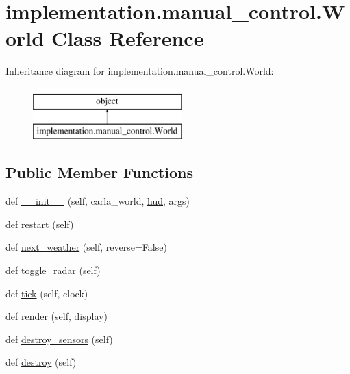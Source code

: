 \hypertarget{classimplementation_1_1manual__control_1_1_world}{}\section{implementation.\+manual\+\_\+control.\+World Class Reference}
\label{classimplementation_1_1manual__control_1_1_world}
Inheritance diagram for implementation.\+manual\+\_\+control.\+World\+:\begin{figure}[H]
\begin{center}
\leavevmode
\includegraphics[height=2.000000cm]{classimplementation_1_1manual__control_1_1_world}
\end{center}
\end{figure}
\subsection*{Public Member Functions}
\begin{DoxyCompactItemize}
\item 
def \hyperlink{classimplementation_1_1manual__control_1_1_world_a9b7dd149b43999a3578fb5287a90dac3}{\+\_\+\+\_\+init\+\_\+\+\_\+} (self, carla\+\_\+world, \hyperlink{classimplementation_1_1manual__control_1_1_world_a6d64507eaf864aa44077eecde0802a13}{hud}, args)
\item 
def \hyperlink{classimplementation_1_1manual__control_1_1_world_a25192730f365273418892f75cfe4fda8}{restart} (self)
\item 
def \hyperlink{classimplementation_1_1manual__control_1_1_world_aab2e4fc6ea1fb0a60e70723265c9005c}{next\+\_\+weather} (self, reverse=False)
\item 
def \hyperlink{classimplementation_1_1manual__control_1_1_world_a1da88da4b1d285a7735b8d602e6a7879}{toggle\+\_\+radar} (self)
\item 
def \hyperlink{classimplementation_1_1manual__control_1_1_world_a3983fc58382d912661a40b1bfc1db7b9}{tick} (self, clock)
\item 
def \hyperlink{classimplementation_1_1manual__control_1_1_world_acd682215837c65396e3a7341b6578f1f}{render} (self, display)
\item 
def \hyperlink{classimplementation_1_1manual__control_1_1_world_a3f0e79efb4722f7e88af7a6a74aa9973}{destroy\+\_\+sensors} (self)
\item 
def \hyperlink{classimplementation_1_1manual__control_1_1_world_a9ac3c5decc18d1bd6be0aa77865ebfbb}{destroy} (self)
\end{DoxyCompactItemize}
